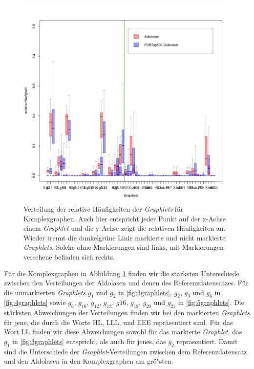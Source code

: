 \documentclass{report}
\begin{document}
\begin{figure}

\includegraphics[scale=0.55]{cg_plot.png}
\caption{Verteilung der relative H\"aufigkeiten der \textit{Graphlets} f\"ur Komplexgraphen. Auch hier entspricht jeder Punkt auf der x-Achse einem \textit{Graphlet} und die y-Achse zeigt die relativen H\"aufigkeiten an. Wieder trennt die dunkelgr\"une Linie markierte und nicht markierte \textit{Graphlets}. Solche ohne Markierungen sind links, mit Markierungen versehene befinden sich rechts.}
\label{fig:cgplot}
\end{figure}

F\"ur die Komplexgraphen in Abbildung \ref{fig:cgplot} finden wir die st\"arksten Unterschiede zwischen den Verteilungen der Aldolasen und denen des Referenzdatensatzes. F\"ur die unmarkierten \textit{Graphlets} $g_1$ und $g_2$ in \ref{fig:3graphlets}, $g_2$, $g_3$ und $g_6$ in \ref{fig:4graphlets} sowie $g_6$, $g_{10}$, $g_{12}$, $g_{13}$, $g{16}$, $g_{18}$, $g_{20}$ und $g_{21}$ in \ref{fig:5graphlets}.
Die st\"arksten Abweichungen der Verteilungen finden wir bei den markierten \textit{Graphlets} f\"ur jene, die durch die Worte HL, LLL, und EEE repr\"asentiert sind. F\"ur das Wort LL finden wir diese Abweichungen sowohl f\"ur das markierte \textit{Graphlet}, das $g_1$ in \ref{fig:3graphlets} entspricht, als auch f\"ur jenes, das $g_2$ repr\"asentiert.
Damit sind die Unterschiede der \textit{Graphlet}-Verteilungen zwischen dem Referenzdatensatz und den Aldolasen in den Komplexgraphen am gr\"o"sten.
\end{document}
